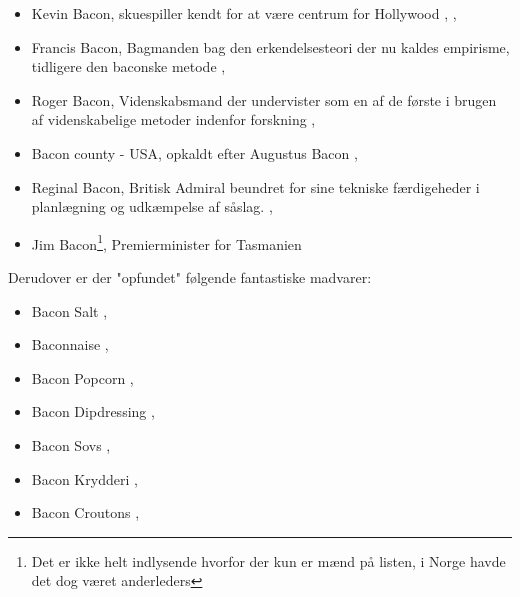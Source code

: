 \begin{itemize}
\item Kevin Bacon, skuespiller kendt for at være centrum for Hollywood \cite{bib:url:oracleofbacon}, \cite{bib:url:kevinBacon}, \cite{bib:url:wikikevinBacon}
\item Francis Bacon, Bagmanden bag den erkendelsesteori der nu kaldes empirisme, tidligere den baconske metode \cite{bib:url:wikifrancisBacon}, \cite{bib:url:wikiBaconisme}
\item Roger Bacon, Videnskabsmand der undervister som en af de første i brugen af videnskabelige metoder indenfor forskning \cite{bib:url:wikiRogerBacon}, \cite{bib:url:wikiRogerBaconMethod}
\item Bacon county - USA, opkaldt efter Augustus Bacon \cite{bib:url:wikiBaconCounty}, \cite{bib:url:wikiAugustusBacon}
\item Reginal Bacon, Britisk Admiral beundret for sine tekniske færdigeheder i planlægning og udkæmpelse af såslag. \cite{bib:url:wikiReginaldBacon}, \cite{bib:url:wikinsmb}
\item Jim Bacon\footnote{Det er ikke helt indlysende hvorfor der kun er mænd på listen, i Norge havde det dog været anderleders}, Premierminister for Tasmanien \cite{bib:url:wikiJimBacon}
\end{itemize}

Derudover er der "opfundet" følgende fantastiske madvarer:
\begin{itemize}
\item Bacon Salt \cite{bib:url:baconsalt}, \cite{bib:url:baconmania}
\item Baconnaise \cite{bib:url:baconnaise}, \cite{bib:url:baconmania}
\item Bacon Popcorn \cite{bib:url:baconpop}, \cite{bib:url:baconmania}
\item Bacon Dipdressing \cite{bib:url:baconranch}, \cite{bib:url:baconmania}
\item Bacon Sovs \cite{bib:url:baconsovs}, \cite{bib:url:baconmania}
\item Bacon Krydderi \cite{bib:url:baconrub}, \cite{bib:url:baconmania}
\item Bacon Croutons \cite{bib:url:baconcroutons}, \cite{bib:url:baconmania}
\end{itemize}